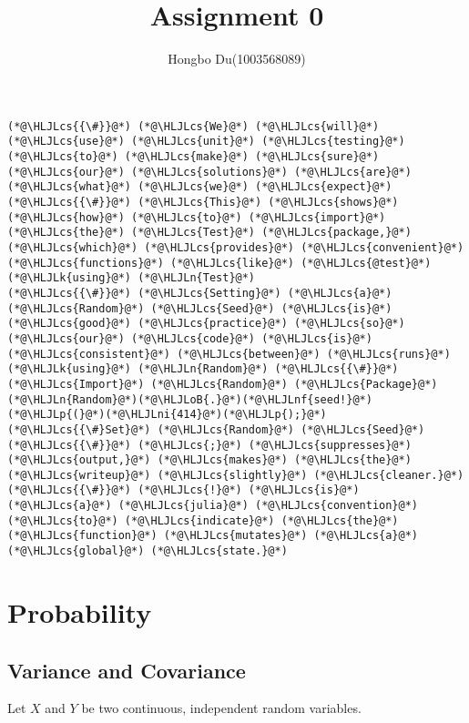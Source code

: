 \documentclass[12pt,a4paper]{article}
\title{ Assignment 0 }
\author{ Hongbo Du(1003568089) }
\newcommand{\HLJLk}[1]{\textcolor[RGB]{148,91,176}{\textbf{#1}}}
\newcommand{\HLJLn}[1]{#1}
\newcommand{\HLJLnf}[1]{\textcolor[RGB]{66,102,213}{#1}}
\newcommand{\HLJLni}[1]{\textcolor[RGB]{59,151,46}{#1}}
\newcommand{\HLJLoB}[1]{\textcolor[RGB]{102,102,102}{\textbf{#1}}}
\newcommand{\HLJLp}[1]{#1}
\newcommand{\HLJLcs}[1]{\textcolor[RGB]{153,153,119}{\textit{#1}}}
\begin{document}
\maketitle


\begin{lstlisting}
(*@\HLJLcs{{\#}}@*) (*@\HLJLcs{We}@*) (*@\HLJLcs{will}@*) (*@\HLJLcs{use}@*) (*@\HLJLcs{unit}@*) (*@\HLJLcs{testing}@*) (*@\HLJLcs{to}@*) (*@\HLJLcs{make}@*) (*@\HLJLcs{sure}@*) (*@\HLJLcs{our}@*) (*@\HLJLcs{solutions}@*) (*@\HLJLcs{are}@*) (*@\HLJLcs{what}@*) (*@\HLJLcs{we}@*) (*@\HLJLcs{expect}@*)
(*@\HLJLcs{{\#}}@*) (*@\HLJLcs{This}@*) (*@\HLJLcs{shows}@*) (*@\HLJLcs{how}@*) (*@\HLJLcs{to}@*) (*@\HLJLcs{import}@*) (*@\HLJLcs{the}@*) (*@\HLJLcs{Test}@*) (*@\HLJLcs{package,}@*) (*@\HLJLcs{which}@*) (*@\HLJLcs{provides}@*) (*@\HLJLcs{convenient}@*) (*@\HLJLcs{functions}@*) (*@\HLJLcs{like}@*) (*@\HLJLcs{@test}@*)
(*@\HLJLk{using}@*) (*@\HLJLn{Test}@*)
(*@\HLJLcs{{\#}}@*) (*@\HLJLcs{Setting}@*) (*@\HLJLcs{a}@*) (*@\HLJLcs{Random}@*) (*@\HLJLcs{Seed}@*) (*@\HLJLcs{is}@*) (*@\HLJLcs{good}@*) (*@\HLJLcs{practice}@*) (*@\HLJLcs{so}@*) (*@\HLJLcs{our}@*) (*@\HLJLcs{code}@*) (*@\HLJLcs{is}@*) (*@\HLJLcs{consistent}@*) (*@\HLJLcs{between}@*) (*@\HLJLcs{runs}@*)
(*@\HLJLk{using}@*) (*@\HLJLn{Random}@*) (*@\HLJLcs{{\#}}@*) (*@\HLJLcs{Import}@*) (*@\HLJLcs{Random}@*) (*@\HLJLcs{Package}@*)
(*@\HLJLn{Random}@*)(*@\HLJLoB{.}@*)(*@\HLJLnf{seed!}@*)(*@\HLJLp{(}@*)(*@\HLJLni{414}@*)(*@\HLJLp{);}@*) (*@\HLJLcs{{\#}Set}@*) (*@\HLJLcs{Random}@*) (*@\HLJLcs{Seed}@*)
(*@\HLJLcs{{\#}}@*) (*@\HLJLcs{;}@*) (*@\HLJLcs{suppresses}@*) (*@\HLJLcs{output,}@*) (*@\HLJLcs{makes}@*) (*@\HLJLcs{the}@*) (*@\HLJLcs{writeup}@*) (*@\HLJLcs{slightly}@*) (*@\HLJLcs{cleaner.}@*)
(*@\HLJLcs{{\#}}@*) (*@\HLJLcs{!}@*) (*@\HLJLcs{is}@*) (*@\HLJLcs{a}@*) (*@\HLJLcs{julia}@*) (*@\HLJLcs{convention}@*) (*@\HLJLcs{to}@*) (*@\HLJLcs{indicate}@*) (*@\HLJLcs{the}@*) (*@\HLJLcs{function}@*) (*@\HLJLcs{mutates}@*) (*@\HLJLcs{a}@*) (*@\HLJLcs{global}@*) (*@\HLJLcs{state.}@*)
\end{lstlisting}


\section{Probability}
\subsection{Variance and Covariance}
Let $X$ and $Y$ be two continuous, independent random variables.
\end{document}
